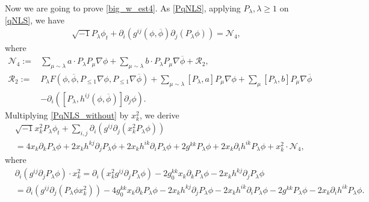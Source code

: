 \documentclass[10pt,twoside,a4paper]{article}
\numberwithin{equation}{section}\allowdisplaybreaks
\def\leq{\leqslant}
\def\geq{\geqslant}
\begin{document}
	Now we are going to prove \eqref{big_w_est4}. As \eqref{PqNLS}, applying $ P_\lambda, \lambda \geq 1 $  on \eqref{qNLS}, we have  
	\begin{align} \label{PqNLS_without}
		\sqrt{-1}  P_{\lambda} \phi_t+\partial_i\left( g^{ij}\left(\phi,\overline{\phi}\right)   \partial_j (P_{\lambda} \phi)\right)=\mathcal{N}_4,
	\end{align}
	where 
	\begin{align*}
		\mathcal{N}_4:=&\sum_{\mu\sim \lambda} a \cdot  P_{\lambda}   P_\mu \nabla \phi + \sum_{\mu\sim \lambda} b\cdot  P_{\lambda}   P_\mu \nabla\overline{ \phi }+\mathcal{R}_2, \\
		\mathcal{R}_2:=& P_{\lambda}  F(\phi, \overline{\phi}, P_{\leq 1} \nabla \phi,  P_{\leq 1} \nabla \overline{\phi}) + \sum_{\mu\sim \lambda} [  P_{\lambda},a  ]  P_\mu \nabla \phi + \sum_{\mu}  [P_{\lambda},b ]  P_\mu \nabla\overline{ \phi } \nonumber\\
		&-\partial_i\left(\left[P_{\lambda}, h^{ij}\left(\phi,\overline{\phi}\right) \right]  \partial_j  \phi \right).   \nonumber
	\end{align*}
	Multiplying \eqref{PqNLS_without} by \( x_k^2 \), we derive
	\begin{align}   \label{eq_big_x2}
		&	\sqrt{-1}x_k^2P_{\lambda}\phi_{ t}+\sum_{i,j}\partial_i\left( g^{ij}   \partial_j \left(x_k^2P_{\lambda}\phi\right)\right)\\
		&=4 x_k \partial_k  P_{\lambda}\phi +2 x_k h^{kj}  \partial_j P_{\lambda}\phi+2 x_k h^{ik} \partial_i P_{\lambda}\phi +2 g^{kk}P_{\lambda}\phi +2 x_k \partial_i h^{ik}P_{\lambda}\phi +x^2_k \cdot\mathcal{N}_4,\nonumber
	\end{align}
	where
	\begin{align*}
		&	\partial_i\left( g^{ij} \partial_j P_{\lambda}\phi\right) \cdot x^2_k= \partial_i\left(  x^2_k g^{ij} \partial_j P_{\lambda}\phi\right)  -2 g^{kk}_0x_k \partial_k  P_{\lambda}\phi -2 x_k h^{kj} \partial_j P_{\lambda}\phi\\ 
		&=\partial_i\left( g^{ij} \partial_j\left(P_{\lambda}\phi x^2_k\right)\right)   -4 g^{kk}_0x_k \partial_k  P_{\lambda}\phi -2 x_k h^{kj} \partial_j P_{\lambda}\phi-2 x_k h^{ik} \partial_i P_{\lambda}\phi-2 g^{kk}P_{\lambda}\phi -2 x_k \partial_i h^{ik}P_{\lambda}\phi.
	\end{align*}
\end{document}
